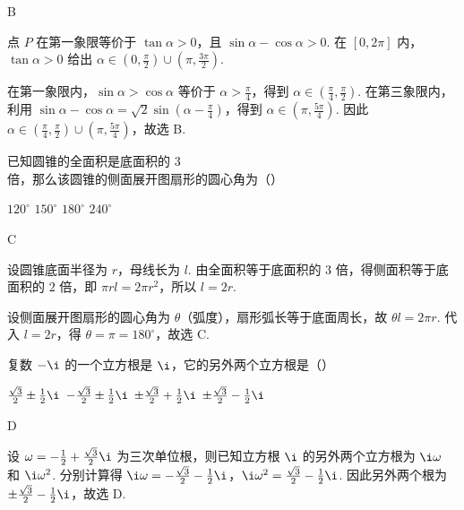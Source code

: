 \documentclass[UTF8,a4paper,oneside,11pt]{ctexbook}
\begin{document}
\begin{answer}
B
\end{answer}

\begin{solution}
点 \(P\) 在第一象限等价于
\(\tan\alpha>0\)，且 \(\sin\alpha-\cos\alpha>0\). 在 \([0,2\pi]\) 内，\(\tan\alpha>0\) 给出
\(\alpha\in(0,\frac{\pi}{2})\cup(\pi,\frac{3\pi}{2})\).

在第一象限内，\(\sin\alpha>\cos\alpha\) 等价于 \(\alpha>\frac{\pi}{4}\)，得到 \(\alpha\in(\frac{\pi}{4},\frac{\pi}{2})\). 在第三象限内，利用
\(\sin\alpha-\cos\alpha=\sqrt{2}\sin(\alpha-\frac{\pi}{4})\)，得到 \(\alpha\in(\pi,\frac{5\pi}{4})\). 因此
\(\alpha\in(\frac{\pi}{4},\frac{\pi}{2})\cup(\pi,\frac{5\pi}{4})\)，故选 B.
\end{solution}

\begin{problem}
已知圆锥的全面积是底面积的 \(3\) 倍，那么该圆锥的侧面展开图扇形的圆心角为（\quad）

\choices
    {\(120^{\circ}\)}
    {\(150^{\circ}\)}
    {\(180^{\circ}\)}
    {\(240^{\circ}\)}
\end{problem}

\begin{answer}
C
\end{answer}

\begin{solution}
设圆锥底面半径为 \(r\)，母线长为 \(l\). 由全面积等于底面积的 \(3\) 倍，得侧面积等于底面积的 \(2\) 倍，即
\(\pi rl=2\pi r^{2}\)，所以 \(l=2r\).

设侧面展开图扇形的圆心角为 \(\theta\)（弧度），扇形弧长等于底面周长，故 \(\theta l=2\pi r\). 代入 \(l=2r\)，得 \(\theta=\pi=180^{\circ}\)，故选 C.
\end{solution}

\begin{problem}
复数 \(-\i\) 的一个立方根是 \(\i\)，它的另外两个立方根是（\quad）

\choices
    {\(\frac{\sqrt{3}}{2} \pm \frac{1}{2}\i\)}
    {\(-\frac{\sqrt{3}}{2} \pm \frac{1}{2}\i\)}
    {\(\pm \frac{\sqrt{3}}{2} + \frac{1}{2}\i\)}
    {\(\pm \frac{\sqrt{3}}{2} - \frac{1}{2}\i\)}
\end{problem}

\begin{answer}
D
\end{answer}

\begin{solution}
设 \(\omega=-\frac{1}{2}+\frac{\sqrt{3}}{2}\i\) 为三次单位根，则已知立方根 \(\i\) 的另外两个立方根为 \(\i\omega\) 和 \(\i\omega^{2}\). 分别计算得
\(\i\omega=-\frac{\sqrt{3}}{2}-\frac{1}{2}\i\)，\(\i\omega^{2}=\frac{\sqrt{3}}{2}-\frac{1}{2}\i\). 因此另外两个根为 \(\pm\frac{\sqrt{3}}{2}-\frac{1}{2}\i\)，故选 D.
\end{solution}
\end{document}
